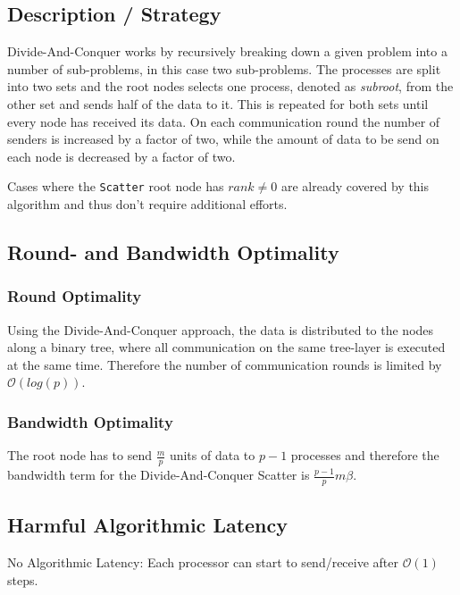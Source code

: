 \subsection{Description / Strategy}

Divide-And-Conquer works by recursively breaking down a given problem into a number of sub-problems, in this case two sub-problems. The processes are split into two sets and the root nodes selects one process, denoted as \textit{subroot}, from the other set and sends half of the data to it. This is repeated for both sets until every node has received its data. On each communication round the number of senders is increased by a factor of two, while the amount of data to be send on each node is decreased by a factor of two.\newline

\noindent Cases where the \texttt{Scatter} root node has $rank \neq 0$ are already covered by this algorithm and thus don't require additional efforts. 

\subsection{Round- and Bandwidth Optimality}

\subsubsection{Round Optimality}

Using the Divide-And-Conquer approach, the data is distributed to the nodes along a binary tree, where all communication on the same tree-layer is executed at the same time. Therefore the number of communication rounds is limited by $\mathcal{O}(log(p))$.

\subsubsection{Bandwidth Optimality}

The root node has to send $\frac{m}{p}$ units of data to $p-1$ processes and therefore the bandwidth term for the Divide-And-Conquer Scatter is $\frac{p-1}{p} m \beta$.

\subsection{Harmful Algorithmic Latency}

No Algorithmic Latency: Each processor can start to send/receive after $\mathcal{O}(1)$ steps.

